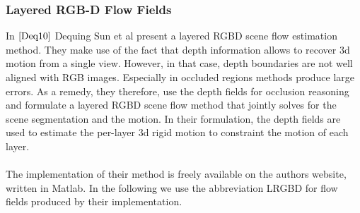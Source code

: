 \subsubsection{Layered RGB-D Flow Fields}
In $\cite{Deq10}$ Dequing Sun et al present a layered RGBD scene flow estimation  method. They make use of the fact that depth information allows to recover 3d motion from a single view. However, in that case, depth boundaries are not well aligned with RGB images. Especially in occluded regions methods produce large errors. As a remedy, they therefore, use the depth fields for occlusion reasoning and formulate a layered RGBD scene flow method that jointly solves for the scene segmentation and the motion. In their formulation, the depth fields are used to estimate the per-layer 3d rigid motion to constraint the motion of each layer. \\ \\
The implementation of their method is freely available on the authors website, written in Matlab. In the following we use the abbreviation LRGBD for flow fields produced by their implementation. \\ \\


